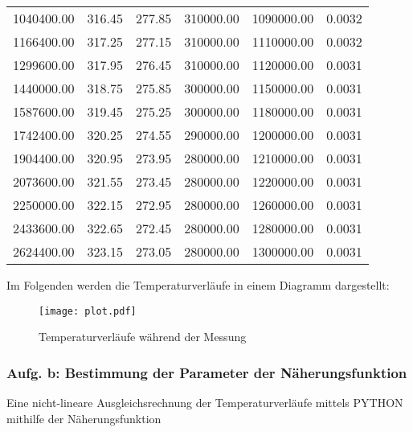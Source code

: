 \begin{table}
\begin{tabular}{c c c c c c}
    1040400.00 &  316.45 &  277.85 & 310000.00 & 1090000.00 &      0.0032 \\
    1166400.00 &  317.25 &  277.15 & 310000.00 & 1110000.00 &      0.0032 \\
    1299600.00 &  317.95 &  276.45 & 310000.00 & 1120000.00 &      0.0031 \\
    1440000.00 &  318.75 &  275.85 & 300000.00 & 1150000.00 &      0.0031 \\
    1587600.00 &  319.45 &  275.25 & 300000.00 & 1180000.00 &      0.0031 \\
    1742400.00 &  320.25 &  274.55 & 290000.00 & 1200000.00 &      0.0031 \\
    1904400.00 &  320.95 &  273.95 & 280000.00 & 1210000.00 &      0.0031 \\
    2073600.00 &  321.55 &  273.45 & 280000.00 & 1220000.00 &      0.0031 \\
    2250000.00 &  322.15 &  272.95 & 280000.00 & 1260000.00 &      0.0031 \\
    2433600.00 &  322.65 &  272.45 & 280000.00 & 1280000.00 &      0.0031 \\
    2624400.00 &  323.15 &  273.05 & 280000.00 & 1300000.00 &      0.0031 \\
    \bottomrule
  \end{tabular}
\end{table}

\newpage


Im Folgenden werden die Temperaturverläufe in einem Diagramm dargestellt:

\begin{figure}
  \centering
  \texttt{[image: plot.pdf]}
  \caption{Temperaturverläufe während der Messung}
  \label{fig:plot}
\end{figure}

\subsubsection{Aufg. b: Bestimmung der Parameter der Näherungsfunktion}

Eine nicht-lineare Ausgleichsrechnung der Temperaturverläufe mittels PYTHON mithilfe der Näherungsfunktion

